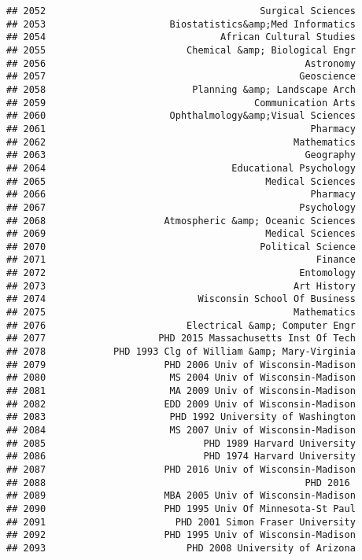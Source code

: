 \documentclass[
]{article}
\begin{document}
\begin{verbatim}
## 2052                                      Surgical Sciences
## 2053                      Biostatistics&amp;Med Informatics
## 2054                               African Cultural Studies
## 2055                         Chemical &amp; Biological Engr
## 2056                                              Astronomy
## 2057                                             Geoscience
## 2058                          Planning &amp; Landscape Arch
## 2059                                     Communication Arts
## 2060                      Ophthalmology&amp;Visual Sciences
## 2061                                               Pharmacy
## 2062                                            Mathematics
## 2063                                              Geography
## 2064                                 Educational Psychology
## 2065                                       Medical Sciences
## 2066                                               Pharmacy
## 2067                                             Psychology
## 2068                     Atmospheric &amp; Oceanic Sciences
## 2069                                       Medical Sciences
## 2070                                      Political Science
## 2071                                                Finance
## 2072                                             Entomology
## 2073                                            Art History
## 2074                           Wisconsin School Of Business
## 2075                                            Mathematics
## 2076                         Electrical &amp; Computer Engr
## 2077                    PHD 2015 Massachusetts Inst Of Tech
## 2078            PHD 1993 Clg of William &amp; Mary-Virginia
## 2079                     PHD 2006 Univ of Wisconsin-Madison
## 2080                      MS 2004 Univ of Wisconsin-Madison
## 2081                      MA 2009 Univ of Wisconsin-Madison
## 2082                     EDD 2009 Univ of Wisconsin-Madison
## 2083                      PHD 1992 University of Washington
## 2084                      MS 2007 Univ of Wisconsin-Madison
## 2085                            PHD 1989 Harvard University
## 2086                            PHD 1974 Harvard University
## 2087                     PHD 2016 Univ of Wisconsin-Madison
## 2088                                              PHD 2016 
## 2089                     MBA 2005 Univ of Wisconsin-Madison
## 2090                     PHD 1995 Univ Of Minnesota-St Paul
## 2091                       PHD 2001 Simon Fraser University
## 2092                     PHD 1995 Univ of Wisconsin-Madison
## 2093                         PHD 2008 University of Arizona

\end{verbatim}
\end{document}
